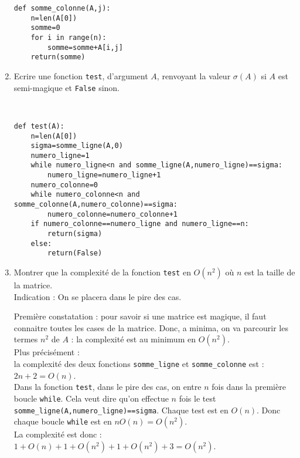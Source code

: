 \begin{enumerate}
\begin{solution}
\begin{verbatim}
def somme_colonne(A,j):
    n=len(A[0])
    somme=0
    for i in range(n):
        somme=somme+A[i,j]
    return(somme) 
\end{verbatim}
\end{solution}
\item Ecrire une fonction \verb?test?, d'argument $A$, renvoyant la valeur $\sigma(A)$ si $A$ est semi-magique et \verb?False? sinon.
\begin{solution}~\\
\vspace*{-0.7cm}
\begin{verbatim}
def test(A):
    n=len(A[0])
    sigma=somme_ligne(A,0)
    numero_ligne=1
    while numero_ligne<n and somme_ligne(A,numero_ligne)==sigma:
        numero_ligne=numero_ligne+1
    numero_colonne=0
    while numero_colonne<n and somme_colonne(A,numero_colonne)==sigma:
        numero_colonne=numero_colonne+1
    if numero_colonne==numero_ligne and numero_ligne==n:
        return(sigma)
    else:
        return(False)
\end{verbatim}
\end{solution}
\item Montrer que la complexité de la fonction \verb?test? en $O(n^2)$ où $n$ est la taille de la matrice.\\
Indication : On se placera dans le pire des cas. 
\begin{solution}
Première constatation : pour savoir si une matrice est magique, il faut connaitre toutes les cases de la matrice. Donc, a minima, on va parcourir les termes $n^2$ de $A$ : la complexité est au minimum en $O(n^2)$.\\
Plus précisément : \\
la complexité des deux fonctions \verb?somme_ligne? et \verb?somme_colonne? est : $2n+2=O(n)$.\\
Dans la fonction \verb?test?, dans le pire des cas, on entre $n$ fois dans la première boucle \verb?while?. Cela veut dire qu'on effectue $n$ fois le test \verb?somme_ligne(A,numero_ligne)==sigma?. Chaque test est en $O(n)$. Donc chaque boucle \verb?while? est en $nO(n)=O(n^2)$.\\
La complexité est donc : $1+O(n)+1+O(n^2)+1+O(n^2)+3=O(n^2)$.\\
\end{solution}
\end{enumerate}

    







